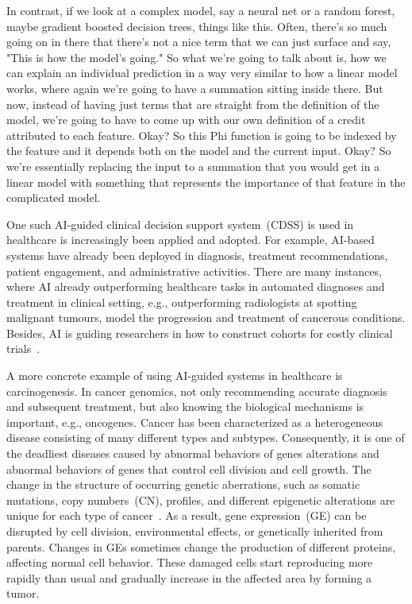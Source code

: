 \hspace*{3.5mm} In contrast, if we look at a complex model, say a neural net or a random forest, maybe gradient boosted decision trees, things like this. Often, there's so much going on in there that there's not a nice term that we can just surface and say, "This is how the model's going." So what we're going to talk about is, how we can explain an individual prediction in a way very similar to how a linear model works, where again we're going to have a summation sitting inside there. But now, instead of having just terms that are straight from the definition of the model, we're going to have to come up with our own definition of a credit attributed to each feature.
Okay? So this Phi function is going to be indexed by the feature and it depends both on the model and the current input. Okay? So we're essentially replacing the input to a summation that you would get in a linear model with something that represents the importance of that feature in the complicated model.

\hspace*{3.5mm} One such AI-guided clinical decision support system~(CDSS) is used in healthcare is increasingly been applied and adopted. For example, AI-based systems have already been deployed in diagnosis, treatment recommendations, patient engagement, and administrative activities. There are many instances, where AI already outperforming healthcare tasks in automated diagnoses and treatment in clinical setting, e.g., outperforming radiologists at spotting malignant tumours, model the progression and treatment of cancerous conditions. Besides, AI is guiding researchers in how to construct cohorts for costly clinical trials~\cite{davenport2019potential}. 

\hspace*{3.5mm} A more concrete example of using AI-guided systems in healthcare is carcinogenesis. In cancer genomics, not only recommending accurate diagnosis and subsequent treatment, but also knowing the biological mechanisms is important, e.g., oncogenes. Cancer has been characterized as a heterogeneous disease consisting of many different types and subtypes. Consequently, it is one of the deadliest diseases caused by abnormal behaviors of genes alterations and abnormal behaviors of genes that control cell division and cell growth. The change in the structure of occurring genetic aberrations, such as somatic mutations, copy numbers~(CN), profiles, and different epigenetic alterations are unique for each type of cancer~\cite{82Tomczak,13cancerdef,19Cruz}. As a result, gene expression~(GE) can be disrupted by cell division, environmental effects, or genetically inherited from parents. Changes in GEs sometimes change the production of different proteins, affecting normal cell behavior. These damaged cells start reproducing more rapidly than usual and gradually increase in the affected area by forming a tumor. 

